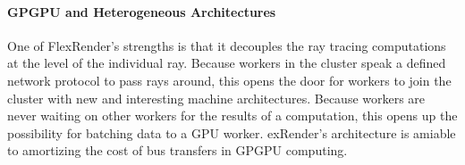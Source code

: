\documentclass[a4paper,twoside]{article}
\begin{document}
\paragraph{GPGPU and Heterogeneous Architectures}
\label{hetergenous}
One of FlexRender's strengths is that it decouples the ray tracing computations
at the level of the individual ray. Because workers in the cluster speak a
defined network protocol to pass rays around, this opens the door for workers to
join the cluster with new and interesting machine architectures.
Because workers are never waiting on other workers for the results of a
computation, this opens up the possibility for batching data to a GPU worker.
exRender's architecture is amiable to amortizing
the cost of bus transfers in GPGPU computing.



{\small
}

\vfill
\end{document}
